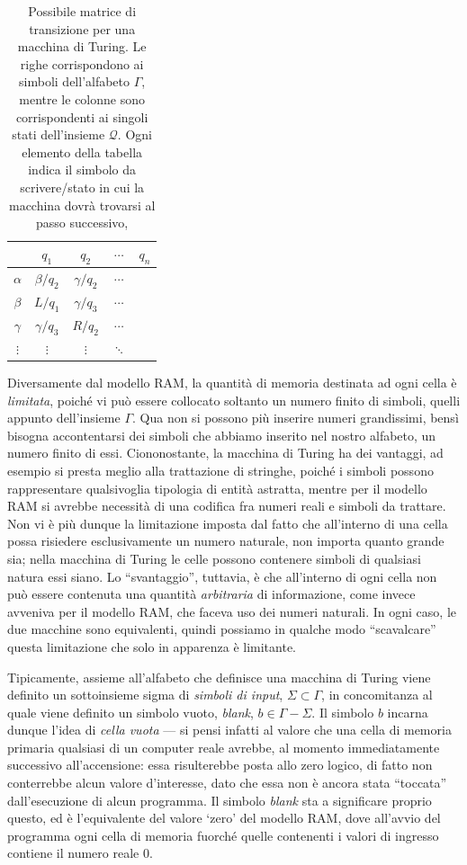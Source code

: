 \documentclass[10pt]{\classname}
\theoremstyle{definition}
\theoremstyle{definition}
\begin{document}
\begin{table}[ht]
\centering
\begin{tabular}{c|cccc}
    & $q_1$ & $q_2$ & $\cdots$ & $q_n$ \\
    \hline
$\alpha$ & $\beta/q_2$ & $\gamma/q_2$ & $\cdots$ & \\
$\beta$ & $L/q_1$ & $\gamma/q_3$ & $\cdots$ & \\
$\gamma$ & $\gamma/q_3$ & $R/q_2$ & $\cdots$ & \\
$\vdots$ & $\vdots$ & $\vdots$ & $\ddots$ &    
\end{tabular}
\caption{Possibile matrice di transizione per una macchina di Turing. Le righe
corrispondono ai simboli dell'alfabeto $\Gamma$, mentre le colonne sono
corrispondenti ai singoli stati dell'insieme $\mathcal
Q$. Ogni elemento della tabella indica il simbolo da scrivere/stato in cui la
macchina dovrà trovarsi al passo successivo,}\label{tab:matriceTransizione}
\end{table}
\bigskip


Diversamente dal modello RAM, la quantità di memoria destinata ad ogni cella è
\emph{limitata}, poiché vi può essere collocato soltanto un numero finito di
simboli, quelli appunto dell'insieme $\Gamma$. Qua non si possono più inserire
numeri grandissimi, bensì bisogna accontentarsi dei simboli che abbiamo inserito
nel nostro alfabeto, un numero finito di essi. Ciononostante, la macchina di
Turing ha dei vantaggi, ad esempio si presta meglio alla trattazione di
stringhe, poiché i simboli possono rappresentare qualsivoglia tipologia di
entità astratta, mentre per il modello RAM si avrebbe necessità di una codifica
fra numeri reali e simboli da trattare. Non vi è più dunque la limitazione
imposta dal fatto che all'interno di una cella possa risiedere esclusivamente
un numero naturale, non importa quanto grande sia; nella macchina di Turing le
celle possono contenere simboli di qualsiasi natura essi siano. Lo
``svantaggio'', tuttavia, è che all'interno di ogni cella non può essere
contenuta una quantità \emph{arbitraria} di informazione, come invece avveniva
per il modello RAM, che faceva uso dei numeri naturali. In ogni caso, le due
macchine sono equivalenti, quindi possiamo in qualche modo ``scavalcare''
questa limitazione che solo in apparenza è limitante.

Tipicamente, assieme all'alfabeto che definisce una macchina di Turing viene definito
un sottoinsieme sigma di \emph{simboli di input}, $\Sigma \subset \Gamma$, in
concomitanza al quale viene definito un simbolo vuoto, \emph{blank}, $b \in
\Gamma - \Sigma$. Il simbolo $b$ incarna dunque l'idea di \emph{cella
vuota} --- si pensi infatti al valore che una cella di memoria primaria
qualsiasi di un computer reale avrebbe, al momento immediatamente successivo
all'accensione: essa risulterebbe posta allo zero logico, di fatto non
conterrebbe alcun valore d'interesse, dato che essa non è ancora stata
``toccata'' dall'esecuzione di alcun programma. Il simbolo \emph{blank} sta a
significare proprio questo, ed è l'equivalente del valore `zero' del modello
RAM, dove all'avvio del programma ogni cella di memoria fuorché quelle
contenenti i valori di ingresso contiene il numero reale $0$. 
\end{document}
